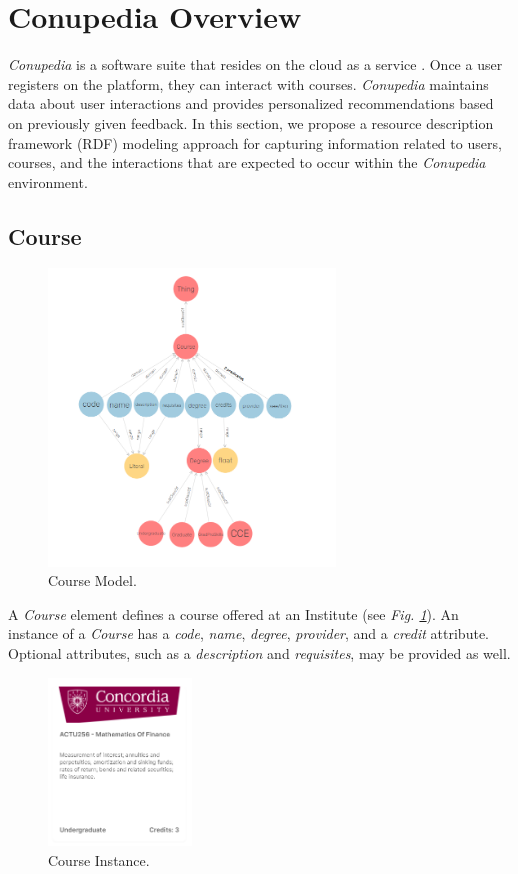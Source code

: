 \documentclass[conference]{IEEEtran}
\begin{document}
\section{Conupedia Overview}
        \textit{Conupedia} is a software suite that resides on the cloud as a service \cite{b1}. 
        Once a user registers on the platform, they can interact with courses. 
        \textit{Conupedia} maintains data about user interactions and provides personalized recommendations based on previously given feedback.
        In this section, we propose a resource description framework (RDF) modeling approach for capturing information related to users, courses, and the interactions that are expected to occur within the \textit{Conupedia} environment.
    \newpage
    \subsection{Course}
        
        \begin{figure}[H]
        \centering
        \includegraphics[width=3in]{img/course.png}
        \caption{Course Model.}
        \label{course_model}
        \end{figure}
  
        A \textit{Course} element defines a course offered at an Institute (see \textit{Fig. \ref{course_model}}). An instance of a \textit{Course} has a \textit{code}, \textit{name}, \textit{degree}, \textit{provider}, and a \textit{credit} attribute. Optional attributes, such as a \textit{description} and \textit{requisites}, may be provided as well.
        
        \begin{figure}[H]
        \centering
        \includegraphics[width=1.5in]{img/course_instance.png}
        \caption{Course Instance.}
        \label{course_instance}
        \end{figure}
        
\end{document}
